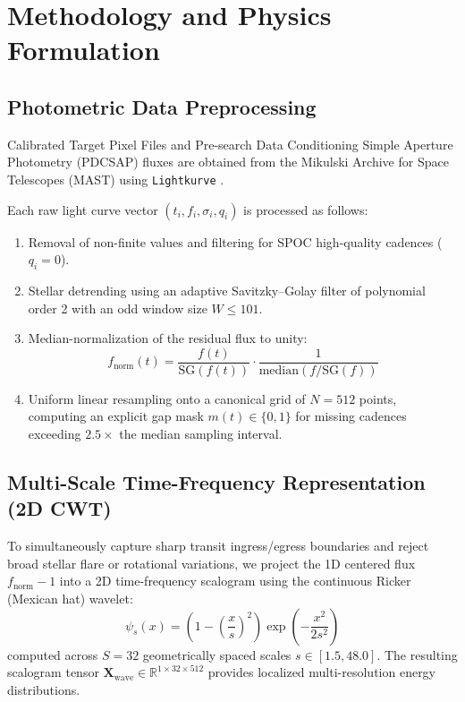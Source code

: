 \documentclass[11pt,a4paper]{article}
\begin{document}
\section{Methodology and Physics Formulation}

\subsection{Photometric Data Preprocessing}

Calibrated Target Pixel Files and Pre-search Data Conditioning Simple Aperture Photometry (PDCSAP) fluxes are obtained from the Mikulski Archive for Space Telescopes (MAST) using \texttt{Lightkurve} \citep{lightkurve2018collaboration}. 

Each raw light curve vector $(t_i, f_i, \sigma_i, q_i)$ is processed as follows:
\begin{enumerate}
    \item Removal of non-finite values and filtering for SPOC high-quality cadences ($q_i = 0$).
    \item Stellar detrending using an adaptive Savitzky--Golay filter of polynomial order 2 with an odd window size $W \le 101$.
    \item Median-normalization of the residual flux to unity:
    \begin{equation}
        f_{\text{norm}}(t) = \frac{f(t)}{\text{SG}(f(t))} \cdot \frac{1}{\text{median}(f/\text{SG}(f))}
    \end{equation}
    \item Uniform linear resampling onto a canonical grid of $N = 512$ points, computing an explicit gap mask $m(t) \in \{0, 1\}$ for missing cadences exceeding $2.5\times$ the median sampling interval.
\end{enumerate}

\subsection{Multi-Scale Time-Frequency Representation (2D CWT)}

To simultaneously capture sharp transit ingress/egress boundaries and reject broad stellar flare or rotational variations, we project the 1D centered flux $f_{\text{norm}} - 1$ into a 2D time-frequency scalogram using the continuous Ricker (Mexican hat) wavelet:
\begin{equation}
    \psi_s(x) = \left(1 - \left(\frac{x}{s}\right)^2\right) \exp\left(-\frac{x^2}{2s^2}\right)
\end{equation}
computed across $S = 32$ geometrically spaced scales $s \in [1.5, 48.0]$. The resulting scalogram tensor $\mathbf{X}_{\text{wave}} \in \mathbb{R}^{1 \times 32 \times 512}$ provides localized multi-resolution energy distributions.
\end{document}
